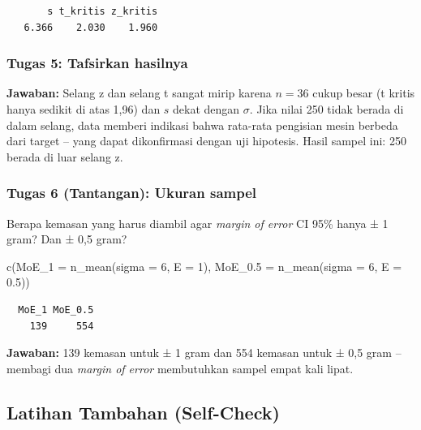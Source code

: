 \documentclass[
  indonesian,
  letterpaper,
]{book}
\newenvironment{Shaded}{\begin{snugshade}}{\end{snugshade}}
\newcommand{\AttributeTok}[1]{\textcolor[rgb]{0.40,0.45,0.13}{#1}}
\newcommand{\DecValTok}[1]{\textcolor[rgb]{0.68,0.00,0.00}{#1}}
\newcommand{\FloatTok}[1]{\textcolor[rgb]{0.68,0.00,0.00}{#1}}
\newcommand{\FunctionTok}[1]{\textcolor[rgb]{0.28,0.35,0.67}{#1}}
\newcommand{\NormalTok}[1]{\textcolor[rgb]{0.00,0.23,0.31}{#1}}
\begin{document}
\begin{verbatim}
       s t_kritis z_kritis 
   6.366    2.030    1.960 
\end{verbatim}

\subsubsection{Tugas 5: Tafsirkan
hasilnya}\label{tugas-5-tafsirkan-hasilnya}

\textbf{Jawaban:} Selang z dan selang t sangat mirip karena \(n = 36\)
cukup besar (t kritis hanya sedikit di atas 1,96) dan \(s\) dekat dengan
\(\sigma\). Jika nilai 250 tidak berada di dalam selang, data memberi
indikasi bahwa rata-rata pengisian mesin berbeda dari target -- yang
dapat dikonfirmasi dengan uji hipotesis. Hasil sampel ini: 250 berada di
luar selang z.

\subsubsection{Tugas 6 (Tantangan): Ukuran
sampel}\label{tugas-6-tantangan-ukuran-sampel}

Berapa kemasan yang harus diambil agar \emph{margin of error} CI 95\%
hanya ± 1 gram? Dan ± 0,5 gram?

\begin{Shaded}
\begin{Highlighting}[]
\FunctionTok{c}\NormalTok{(}\AttributeTok{MoE\_1 =} \FunctionTok{n\_mean}\NormalTok{(}\AttributeTok{sigma =} \DecValTok{6}\NormalTok{, }\AttributeTok{E =} \DecValTok{1}\NormalTok{), }\AttributeTok{MoE\_0.5 =} \FunctionTok{n\_mean}\NormalTok{(}\AttributeTok{sigma =} \DecValTok{6}\NormalTok{, }\AttributeTok{E =} \FloatTok{0.5}\NormalTok{))}
\end{Highlighting}
\end{Shaded}

\begin{verbatim}
  MoE_1 MoE_0.5 
    139     554 
\end{verbatim}

\textbf{Jawaban:} 139 kemasan untuk ± 1 gram dan 554 kemasan untuk ± 0,5
gram -- membagi dua \emph{margin of error} membutuhkan sampel empat kali
lipat.

\subsection{Latihan Tambahan
(Self-Check)}\label{latihan-tambahan-self-check}
\end{document}
